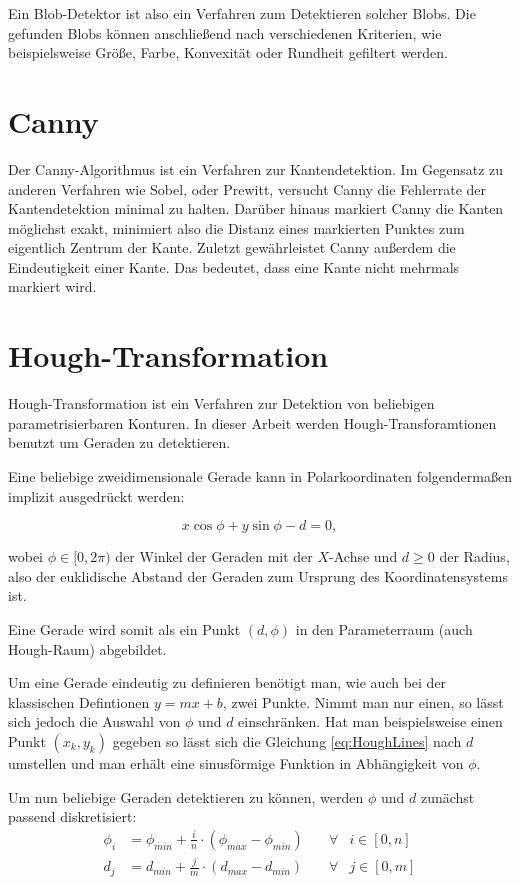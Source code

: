 Ein Blob-Detektor ist also ein Verfahren zum Detektieren solcher Blobs. Die gefunden Blobs können anschließend nach verschiedenen Kriterien, wie beispielsweise Größe, Farbe, Konvexität oder Rundheit gefiltert werden. 

\section{Canny}
\label{s:canny}
Der Canny-Algorithmus \cite{Canny1986} ist ein Verfahren zur Kantendetektion. Im Gegensatz zu anderen Verfahren wie Sobel, oder Prewitt, versucht Canny die Fehlerrate der Kantendetektion minimal zu halten. 
Darüber hinaus markiert Canny die Kanten möglichst exakt, minimiert also die Distanz eines markierten Punktes zum eigentlich Zentrum der Kante. 
Zuletzt gewährleistet Canny außerdem die Eindeutigkeit einer Kante. Das bedeutet, dass eine Kante nicht mehrmals markiert wird.

\section{Hough-Transformation}
\label{s:hough}
Hough-Transformation ist ein Verfahren zur Detektion von beliebigen parametrisierbaren Konturen. In dieser Arbeit werden Hough-Transforamtionen benutzt um Geraden zu detektieren. 

Eine beliebige zweidimensionale Gerade kann in Polarkoordinaten folgendermaßen implizit ausgedrückt werden:

\begin{equation}\label{eq:HoughLines}
x\cos\phi + y\sin\phi - d = 0,
\end{equation}

wobei $\phi \in [0,2\pi)$ der Winkel der Geraden mit der $X$-Achse und $d \geq 0$ der Radius, also der euklidische Abstand der Geraden zum Ursprung des Koordinatensystems ist.

Eine Gerade wird somit als ein Punkt $(d,\phi)$ in den Parameterraum (auch Hough-Raum) abgebildet. 

Um eine Gerade eindeutig zu definieren benötigt man, wie auch bei der klassischen Defintionen $y = mx + b$, zwei Punkte. Nimmt man nur einen, so lässt sich jedoch die Auswahl von $\phi$ und $d$ einschränken. Hat man beispielsweise einen Punkt $(x_k,y_k)$ gegeben so lässt sich die Gleichung \ref{eq:HoughLines} nach $d$ umstellen und man erhält eine sinusförmige Funktion in Abhängigkeit von $\phi$. 

Um nun beliebige Geraden detektieren zu können, werden $\phi$ und $d$ zunächst passend diskretisiert:
\begin{equation*}
	\begin{aligned}
		\phi_i &= \phi_{min} + \frac{i}{n} \cdot (\phi_{max} - \phi_{min}) \quad&\forall &i\in [0,n]\\
		d_j &= d_{min} + \frac{j}{m} \cdot  (d_{max} - d_{min}) &\forall &j\in [0,m]
	\end{aligned}
\end{equation*}

